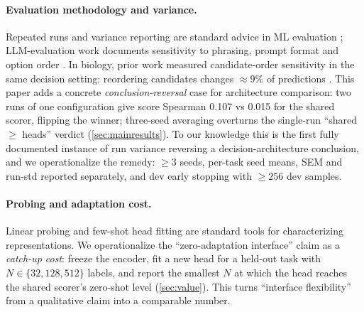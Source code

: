 \paragraph{Evaluation methodology and variance.}
Repeated runs and variance reporting are standard advice in ML evaluation
\citep{bouthillier2021variance,miller2024errorbars}; LLM-evaluation work documents
sensitivity to phrasing, prompt format and option order \citep{miller2024errorbars}. In
biology, prior work measured candidate-order sensitivity in the same decision setting:
reordering candidates changes ${\approx}9\%$ of predictions \citep{wang2026biopaws}. This paper adds a concrete \emph{conclusion-reversal}
case for architecture comparison: two runs of one configuration give score Spearman 0.107
vs 0.015 for the shared scorer, flipping the winner; three-seed averaging overturns the
single-run ``shared $\ge$ heads'' verdict (\cref{sec:mainresults}). To our knowledge this is
the first fully documented instance of run variance reversing a decision-architecture
conclusion, and we operationalize the remedy: $\ge3$ seeds, per-task seed means, SEM and
run-std reported separately, and dev early stopping with $\ge256$ dev samples.

\paragraph{Probing and adaptation cost.}
Linear probing and few-shot head fitting are standard tools for characterizing
representations. We operationalize the ``zero-adaptation interface'' claim as a
\emph{catch-up cost}: freeze the encoder, fit a new head for a held-out task with
$N\in\{32,128,512\}$ labels, and report the smallest $N$ at which the head reaches the
shared scorer's zero-shot level (\cref{sec:value}). This turns ``interface flexibility''
from a qualitative claim into a comparable number.
